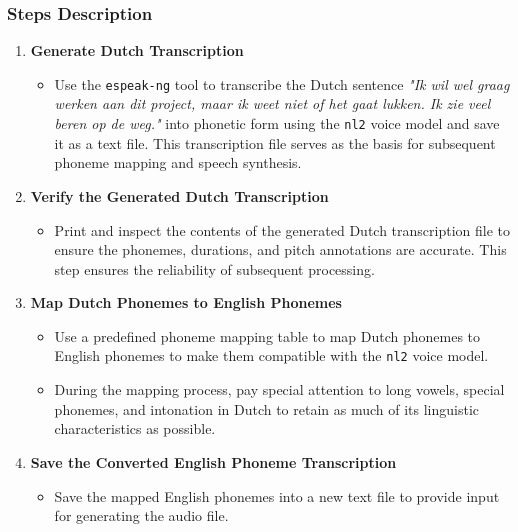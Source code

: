 \documentclass{../labbook}
\begin{document}
\begin{solution}
\subsubsection*{Steps Description}
\begin{enumerate}
    \item \textbf{Generate Dutch Transcription}
    \begin{itemize}
        \item Use the \texttt{espeak-ng} tool to transcribe the Dutch sentence 
        \textit{"Ik wil wel graag werken aan dit project, maar ik weet niet of het gaat lukken. Ik zie veel beren op de weg."} into phonetic form using the \texttt{nl2} voice model and save it as a text file. This transcription file serves as the basis for subsequent phoneme mapping and speech synthesis.
    \end{itemize}

    \item \textbf{Verify the Generated Dutch Transcription}
    \begin{itemize}
        \item Print and inspect the contents of the generated Dutch transcription file to ensure the phonemes, durations, and pitch annotations are accurate. This step ensures the reliability of subsequent processing.
    \end{itemize}

    \item \textbf{Map Dutch Phonemes to English Phonemes}
    \begin{itemize}
        \item Use a predefined phoneme mapping table to map Dutch phonemes to English phonemes to make them compatible with the \texttt{nl2} voice model.
        \item During the mapping process, pay special attention to long vowels, special phonemes, and intonation in Dutch to retain as much of its linguistic characteristics as possible.
    \end{itemize}

    \item \textbf{Save the Converted English Phoneme Transcription}
    \begin{itemize}
        \item Save the mapped English phonemes into a new text file to provide input for generating the audio file.
    \end{itemize}


\end{enumerate}
\end{solution}
\end{document}
